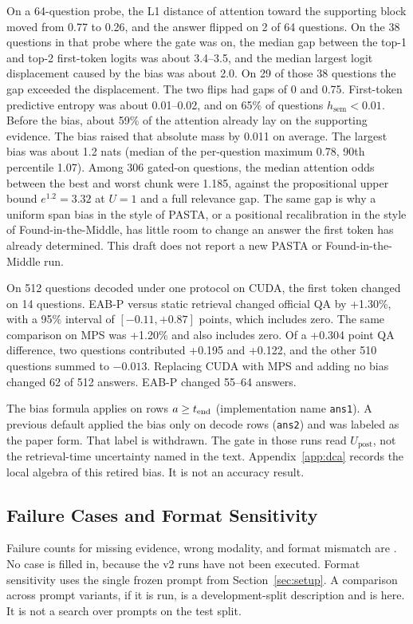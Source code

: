 On a 64-question probe, the L1 distance of attention toward the supporting block moved from 0.77 to 0.26, and the answer flipped on 2 of 64 questions.
On the 38 questions in that probe where the gate was on, the median gap between the top-1 and top-2 first-token logits was about 3.4--3.5, and the median largest logit displacement caused by the bias was about 2.0.
On 29 of those 38 questions the gap exceeded the displacement.
The two flips had gaps of 0 and 0.75.
First-token predictive entropy was about 0.01--0.02, and on 65\% of questions $h_{\mathrm{sem}}<0.01$.
Before the bias, about 59\% of the attention already lay on the supporting evidence.
The bias raised that absolute mass by 0.011 on average.
The largest bias was about 1.2 nats (median of the per-question maximum 0.78, 90th percentile 1.07).
Among 306 gated-on questions, the median attention odds between the best and worst chunk were 1.185, against the propositional upper bound $e^{1.2}=3.32$ at $U=1$ and a full relevance gap.
The same gap is why a uniform span bias in the style of PASTA, or a positional recalibration in the style of Found-in-the-Middle, has little room to change an answer the first token has already determined.
This draft does not report a new PASTA or Found-in-the-Middle run.

On 512 questions decoded under one protocol on CUDA, the first token changed on 14 questions.
EAB-P versus static retrieval changed official QA by +1.30\%, with a 95\% interval of $[-0.11,+0.87]$ points, which includes zero.
The same comparison on MPS was +1.20\% and also includes zero.
Of a +0.304 point QA difference, two questions contributed +0.195 and +0.122, and the other 510 questions summed to $-0.013$.
Replacing CUDA with MPS and adding no bias changed 62 of 512 answers.
EAB-P changed 55--64 answers.

The bias formula applies on rows $a\ge t_{\mathrm{end}}$ (implementation name \texttt{ans1}).
A previous default applied the bias only on decode rows (\texttt{ans2}) and was labeled as the paper form.
That label is withdrawn.
The gate in those runs read $U_{\mathrm{post}}$, not the retrieval-time uncertainty named in the text.
Appendix~\ref{app:dca} records the local algebra of this retired bias.
It is not an accuracy result.

\subsection{Failure Cases and Format Sensitivity}
\label{sec:cases}
Failure counts for missing evidence, wrong modality, and format mismatch are \ph{}.
No case is filled in, because the v2 runs have not been executed.
Format sensitivity uses the single frozen prompt from Section~\ref{sec:setup}.
A comparison across prompt variants, if it is run, is a development-split description and is \ph{} here.
It is not a search over prompts on the test split.


